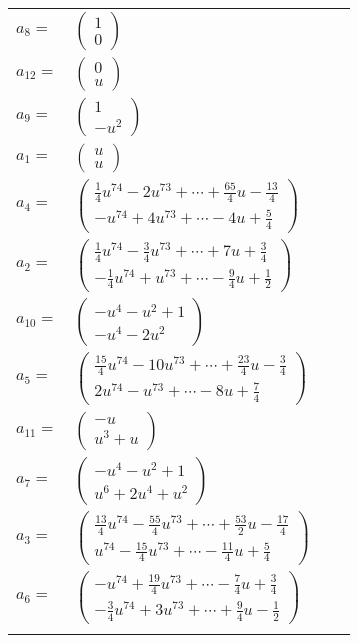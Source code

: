 \documentclass[1p]{elsarticle_modified}
\theoremstyle{definition}
\begin{document}
\begin{tabular}{m{7pt} m{180pt} m{7pt} m{180pt} }
\flushright $a_{8}=$&$\begin{pmatrix}1\\0\end{pmatrix}$ \\
\flushright $a_{12}=$&$\begin{pmatrix}0\\u\end{pmatrix}$ \\
\flushright $a_{9}=$&$\begin{pmatrix}1\\- u^2\end{pmatrix}$ \\
\flushright $a_{1}=$&$\begin{pmatrix}u\\u\end{pmatrix}$ \\
\flushright $a_{4}=$&$\begin{pmatrix}\frac{1}{4} u^{74}-2 u^{73}+\cdots+\frac{65}{4} u-\frac{13}{4}\\- u^{74}+4 u^{73}+\cdots-4 u+\frac{5}{4}\end{pmatrix}$ \\
\flushright $a_{2}=$&$\begin{pmatrix}\frac{1}{4} u^{74}-\frac{3}{4} u^{73}+\cdots+7 u+\frac{3}{4}\\-\frac{1}{4} u^{74}+u^{73}+\cdots-\frac{9}{4} u+\frac{1}{2}\end{pmatrix}$ \\
\flushright $a_{10}=$&$\begin{pmatrix}- u^4- u^2+1\\- u^4-2 u^2\end{pmatrix}$ \\
\flushright $a_{5}=$&$\begin{pmatrix}\frac{15}{4} u^{74}-10 u^{73}+\cdots+\frac{23}{4} u-\frac{3}{4}\\2 u^{74}- u^{73}+\cdots-8 u+\frac{7}{4}\end{pmatrix}$ \\
\flushright $a_{11}=$&$\begin{pmatrix}- u\\u^3+u\end{pmatrix}$ \\
\flushright $a_{7}=$&$\begin{pmatrix}- u^4- u^2+1\\u^6+2 u^4+u^2\end{pmatrix}$ \\
\flushright $a_{3}=$&$\begin{pmatrix}\frac{13}{4} u^{74}-\frac{55}{4} u^{73}+\cdots+\frac{53}{2} u-\frac{17}{4}\\u^{74}-\frac{15}{4} u^{73}+\cdots-\frac{11}{4} u+\frac{5}{4}\end{pmatrix}$ \\
\flushright $a_{6}=$&$\begin{pmatrix}- u^{74}+\frac{19}{4} u^{73}+\cdots-\frac{7}{4} u+\frac{3}{4}\\-\frac{3}{4} u^{74}+3 u^{73}+\cdots+\frac{9}{4} u-\frac{1}{2}\end{pmatrix}$\\&\end{tabular}
\end{document}
